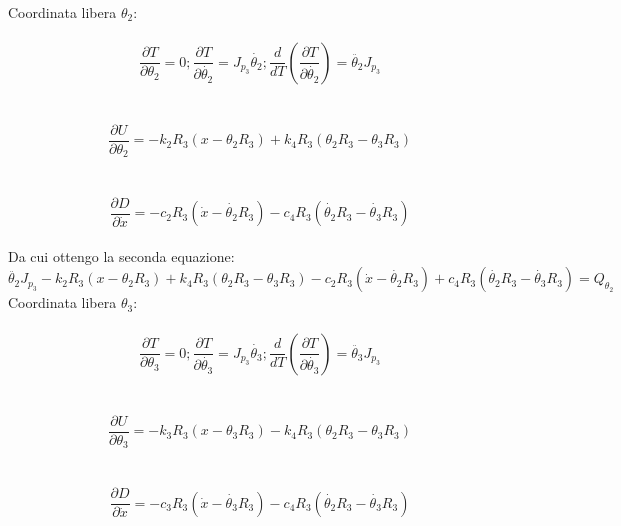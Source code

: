 \documentclass{article}
\begin{document}
\\
Coordinata libera $\theta_2$:
\\
\\
\begin{equation*}
\frac{ \partial T}{\partial \theta_2} = 0 ; \frac{\partial T}{\partial \dot{\theta_2}} = J_{p_3}\dot{\theta_2};  \frac{d}{dT}(\frac{\partial T}{\partial \dot{\theta_2}})  = \ddot{\theta_2}J_{p_3}
\end{equation*}
\\
\\
\begin{equation*}
\frac{\partial U}{\partial \theta_2} = -k_2R_3(x-\theta_2R_3) + k_4R_3(\theta_2 R_3 - \theta_3 R_3)
\end{equation*}
\\
\\
\begin{equation*}
\frac{\partial D}{\partial \dot{x}} = -c_2R_3(\dot{x} - \dot{\theta_2}R_3) - c_4R_3(\dot{\theta_2}R_3 - \dot{\theta_3}R_3)
\end{equation*}
\\
Da cui ottengo la seconda equazione: 
\\
\begin{equation*}
 \ddot{\theta_2}J_{p_3} - k_{2}R_{3}(x - \theta_{2}R_{3}) + k_{4}R_3(\theta_{2}R_3 - \theta_{3}R_{3}) - c_{2}R_{3}(\dot{x}-\dot{\theta_2}R_{3}) + c_{4}R_{3}(\dot{\theta_2}R_3 - \dot{\theta_{3}}R_{3}) = Q_{\theta_2}
\end{equation*}
Coordinata libera $\theta_3$:
\\
\\
\begin{equation*}
\frac{ \partial T}{\partial \theta_3} = 0 ; \frac{\partial T}{\partial \dot{\theta_3}} = J_{p_3}\dot{\theta_3};  \frac{d}{dT}(\frac{\partial T}{\partial \dot{\theta_3}})  = \ddot{\theta_3}J_{p_3}
\end{equation*}
\\
\\
\begin{equation*}
\frac{\partial U}{\partial \theta_3} = -k_3R_3(x - \theta_3R_3) - k_4R_3(\theta_2 R_3 - \theta_3 R_3)
\end{equation*}
\\
\\
\begin{equation*}
\frac{\partial D}{\partial \dot{x}} = -c_3R_3(\dot{x}-\dot{\theta_3}R_3) - c_4R_3(\dot{\theta_2} R_3 - \dot{\theta_3} R_3)
\end{equation*}
\end{document}
